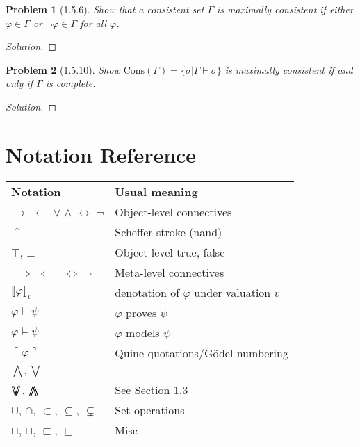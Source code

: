 \documentclass[letter]{article}
\newtheorem{problem}{Problem}
\theoremstyle{definition}
\newenvironment{solution}
{\begin{proof}[Solution]}
	{\end{proof}}
\renewcommand{\phi}{\varphi}
\DeclareMathOperator*{\bigdoublewedge}{\bigwedge\mkern-15mu\bigwedge}
\DeclareMathOperator*{\bigdoublevee}{\bigvee\mkern-15mu\bigvee}
\begin{document}
\begin{problem}[1.5.6] Show that a consistent set $\Gamma$ is maximally consistent if either $\phi \in \Gamma$ or $\neg \phi \in \Gamma$ for all $\phi$.
\end{problem}
\begin{solution}
\end{solution}


\begin{problem}[1.5.10] Show $\textrm{Cons}(\Gamma) = \{ \sigma | \Gamma \vdash \sigma \}$ is maximally consistent if and only if $\Gamma$ is complete.
\end{problem}
\begin{solution}
\end{solution}


\section{Notation Reference}

\begin{table}[H]
    \begin{tabular}{ll}
        \textbf{Notation} & \textbf{Usual meaning} \\
        $\to$ $\leftarrow$ $\lor$ $\land$ $\leftrightarrow$ $\neg$ & Object-level connectives \\
        $\uparrow$ & Scheffer stroke (nand)\\
        $\top$, $\bot$ & Object-level true, false \\
        $\implies$ $\impliedby$ $\iff$ $\neg$ & Meta-level connectives \\
        
        $\llbracket \phi \rrbracket_v$ & denotation of $\phi$ under valuation $v$\\
        $\phi \vdash \psi$ & $\phi$ proves $\psi$ \\
        $\phi \models \psi$ & $\phi$ models $\psi$ \\
        $\ulcorner \phi \urcorner$ & Quine quotations/G\"odel numbering \\
        $\bigwedge, \bigvee$ & \\        
        $\bigdoublevee$, $\bigdoublewedge$ & See Section 1.3 \\
        $\cup$, $\cap$, $\subset$, $\subseteq$, $\subsetneq$ & Set operations \\
        $\sqcup$, $\sqcap$, $\sqsubset$, $\sqsubseteq$ & Misc \\
\end{tabular}
\end{table}
\end{document}
